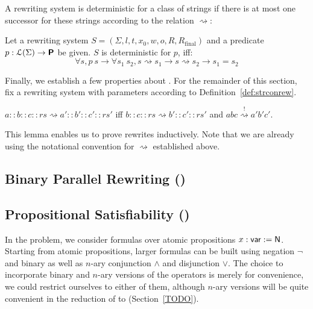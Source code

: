 \documentclass[a4paper,UKenglish,cleveref, autoref]{lipics-v2019}
\newcommand{\TODO}[1]{\ifthenelse{\isundefined{\showTODOs}}{}{\colorbox{red}{\LARGE TODO}:#1}}
\newcommand{\strent}{\rightsquigarrow}
\newcommand{\constrent}{\overset{!}{\rightsquigarrow}}
\newcommand{\Rfinal}{R_{\text{final}}}
\begin{document}
A rewriting system is deterministic for a class of strings if there is at most one successor for these strings according to the relation $\strent{}$:
\begin{definition}[Determinism]\label{def:rewdet}
  Let a rewriting system $S = (\Sigma, l, t, x_0, w, o, R, \Rfinal)$ and a predicate $p : \mathcal{L} (\Sigma) \rightarrow \textsf{\bfseries P}$ be given. 
  $S$ is deterministic for $p$, iff: 
  \[ \forall s, p~s \rightarrow \forall s_1~s_2, s \strent{} s_1 \rightarrow s \strent{} s_2 \rightarrow s_1 = s_2 \]
\end{definition}


Finally, we establish a few properties about \strconrew{}. For the remainder of this section, fix a rewriting system with parameters according to Definition~\ref{def:strconrew}.

\begin{lemma}\label{lem:rewind}
  $a :: b :: c :: rs \strent{} a' :: b' :: c' :: rs'$ iff $b :: c :: rs \strent{} b' :: c' :: rs'$ and $abc \constrent{} a'b'c'$. 
\end{lemma}
This lemma enables us to prove rewrites inductively. Note that we are already using the notational convention for $\strent{}$ established above.

\subsection{Binary Parallel Rewriting (\binstrconrew{})}
\TODO{}

\subsection{Propositional Satisfiability (\csat{})}
\newcommand{\var}{\textsf{var}}
\newcommand{\literal}{\textsf{literal}}
\newcommand{\clause}{\textsf{clause}}
\newcommand{\cnf}{\textsf{cnf}}
\newcommand{\assgn}{\textsf{assgn}}
\newcommand{\eval}[2]{\mathcal{E}~#1~#2}
\newcommand{\for}{\textsf{For}}


In the \csat{} problem, we consider formulas over atomic propositions $x : \var := \nat$. Starting from atomic propositions, larger formulas can be built using negation $\lnot$ and binary as well as $n$-ary conjunction $\land$ and disjunction $\lor$. The choice to incorporate binary and $n$-ary versions of the operators is merely for convenience, we could restrict ourselves to either of them, although $n$-ary versions will be quite convenient in the reduction of \csat{} to \sat{} (Section~\ref{TODO}). 
\end{document}
